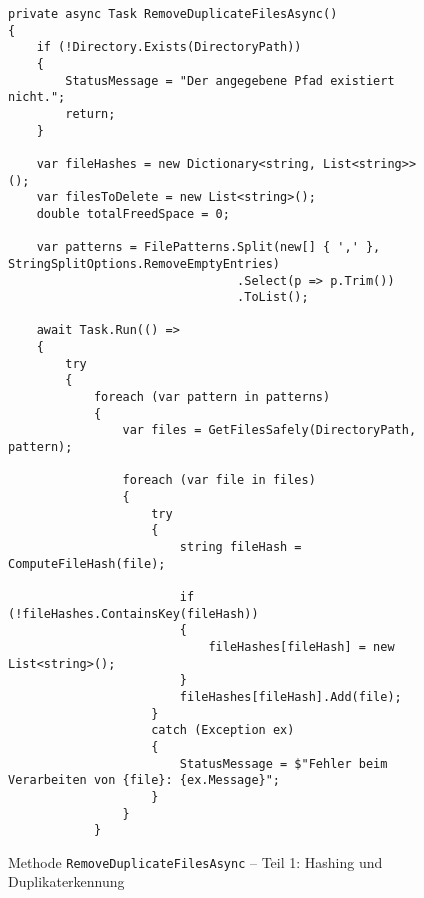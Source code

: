 \begin{figure}[H]
\centering
\begin{verbatim}
private async Task RemoveDuplicateFilesAsync()
{
    if (!Directory.Exists(DirectoryPath))
    {
        StatusMessage = "Der angegebene Pfad existiert nicht.";
        return;
    }

    var fileHashes = new Dictionary<string, List<string>>();
    var filesToDelete = new List<string>();
    double totalFreedSpace = 0;

    var patterns = FilePatterns.Split(new[] { ',' }, StringSplitOptions.RemoveEmptyEntries)
                                .Select(p => p.Trim())
                                .ToList();

    await Task.Run(() =>
    {
        try
        {
            foreach (var pattern in patterns)
            {
                var files = GetFilesSafely(DirectoryPath, pattern);

                foreach (var file in files)
                {
                    try
                    {
                        string fileHash = ComputeFileHash(file);

                        if (!fileHashes.ContainsKey(fileHash))
                        {
                            fileHashes[fileHash] = new List<string>();
                        }
                        fileHashes[fileHash].Add(file);
                    }
                    catch (Exception ex)
                    {
                        StatusMessage = $"Fehler beim Verarbeiten von {file}: {ex.Message}";
                    }
                }
            }
\end{verbatim}
\caption{Methode \texttt{RemoveDuplicateFilesAsync} – Teil 1: Hashing und Duplikaterkennung}
\label{lst:removedupes1}
\end{figure}
